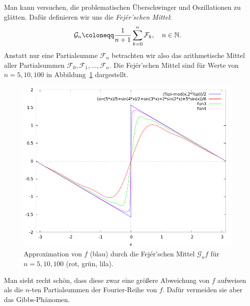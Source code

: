 \begin{example}
Man kann versuchen, die problematischen Überschwinger und Oszillationen zu glätten. Dafür definieren
wir uns die \emph{Fej\'{e}r'schen Mittel}:
\[
  \mathcal{G}_{n} \coloneqq \frac{1}{n + 1} \sum_{k = 0}^{n} \mathcal{F}_{k}, \quad n \in \N.
\]
Anstatt nur eine Partialsumme $ \mathcal{F}_{n} $ betrachten wir also das arithmetische Mittel 
aller Partialsummen $ \mathcal{F}_{0}, \mathcal{F}_{1}, \ldots, \mathcal{F}_{n} $. Die 
Fej\'{e}r'schen Mittel sind für Werte von $ n = 5, 10, 100 $ in Abbildung~\ref{fig:sawtooth_fejer}
dargestellt.
\begin{figure}[ht]
\centering
\includegraphics[width=0.5\linewidth]{Bilder/sawtooth_fejer}
\caption{Approximation von $ f $ (blau) durch die Fej\'{e}r'schen Mittel $ \mathcal{G}_{n}f $ für 
$ n = 5, 10, 100 $ (rot, grün, lila).}
\label{fig:sawtooth_fejer}
\end{figure}
Man sieht recht schön, dass diese zwar eine größere Abweichung von $ f $ aufweisen als die
$ n $-ten Partialsummen der Fourier-Reihe von $ f $. Dafür vermeiden sie aber das Gibbs-Phänomen.
\end{example}